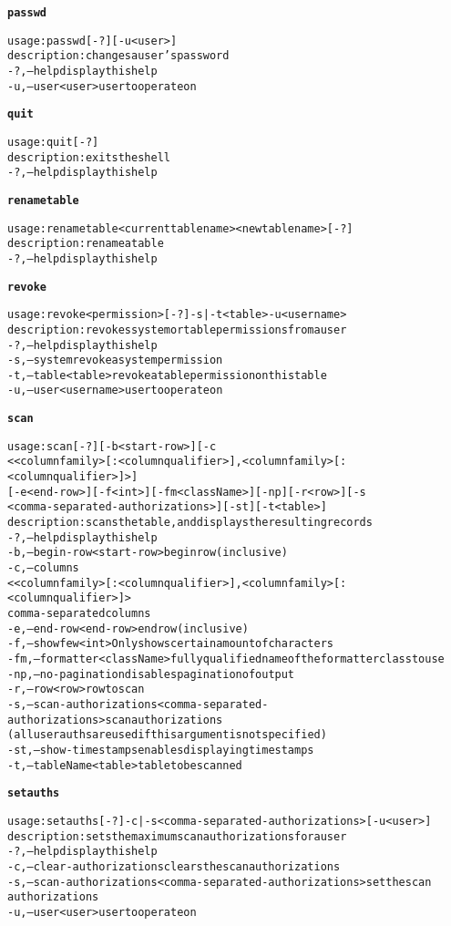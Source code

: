 \begin{alltt}
\textbf{passwd}

    usage: passwd [-?] [-u <user>]
    description: changes a user's password
      -?,--help  display this help
      -u,--user <user>  user to operate on

\textbf{quit}

    usage: quit [-?]
    description: exits the shell
      -?,--help  display this help

\textbf{renametable}

    usage: renametable <current table name> <new table name> [-?]
    description: rename a table
      -?,--help  display this help

\textbf{revoke}

    usage: revoke <permission> [-?] -s | -t <table>  -u <username>
    description: revokes system or table permissions from a user
      -?,--help  display this help
      -s,--system  revoke a system permission
      -t,--table <table>  revoke a table permission on this table
      -u,--user <username>  user to operate on

\textbf{scan}

    usage: scan [-?] [-b <start-row>] [-c
              <<columnfamily>[:<columnqualifier>]{,<columnfamily>[:<columnqualifier>]}>]
              [-e <end-row>] [-f <int>] [-fm <className>] [-np] [-r <row>] [-s
              <comma-separated-authorizations>] [-st] [-t <table>]
    description: scans the table, and displays the resulting records
      -?,--help  display this help
      -b,--begin-row <start-row>  begin row (inclusive)
      -c,--columns
              <<columnfamily>[:<columnqualifier>]{,<columnfamily>[:<columnqualifier>]}> 
              comma-separated columns
      -e,--end-row <end-row>  end row (inclusive)
      -f,--show few <int>  Only shows certain amount of characters
      -fm,--formatter <className>  fully qualified name of the formatter class to use
      -np,--no-pagination  disables pagination of output
      -r,--row <row>  row to scan
      -s,--scan-authorizations <comma-separated-authorizations>  scan authorizations
              (all user auths are used if this argument is not specified)
      -st,--show-timestamps  enables displaying timestamps
      -t,--tableName <table>  table to be scanned

\textbf{setauths}

    usage: setauths [-?] -c | -s <comma-separated-authorizations>  [-u <user>]
    description: sets the maximum scan authorizations for a user
      -?,--help  display this help
      -c,--clear-authorizations  clears the scan authorizations
      -s,--scan-authorizations <comma-separated-authorizations>  set the scan
              authorizations
      -u,--user <user>  user to operate on


\end{alltt}
